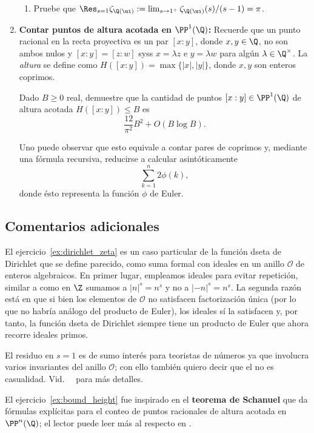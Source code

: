 \documentclass[11pt, reqno]{amsart}
\begin{document}
\begin{enumerate}
\begin{enumerate}
			\item\lookst
				Pruebe que $\Res_{s=1} \zeta_{\Q(\ui)} := \lim_{s \to 1^+} \zeta_{\Q(\ui)}(s)/(s - 1) = \pi$.
		\end{enumerate}

		\newex
	\item\label{ex:bound_height} \lookst
		\textbf{Contar puntos de altura acotada en $\PP^1(\Q)$:}
		Recuerde que un punto racional en la recta proyectiva es un par $[x : y]$, donde $x, y \in \Q$, no son ambos nulos y $[x :
		y] = [z : w]$ syss $x = \lambda z$ e $y = \lambda w$ para algún $\lambda \in \Q^\times$.
		La \emph{altura} se define como $H([x : y]) = \max\{ |x|, |y| \}$, donde $x, y$ son enteros coprimos.

		Dado $B \ge 0$ real, demuestre que la cantidad de puntos $[x : y] \in \PP^1(\Q)$ de altura acotada $H([x : y]) \le B$ es
		$$ \frac{12}{\pi^2}B^2 + O(B \log B). $$
		\begin{hint}
			Uno puede observar que esto equivale a contar pares de coprimos y, mediante una fórmula recursiva, reducirse a calcular
			asintóticamente
			$$ \sum_{k=1}^{n} 2\phi(k), $$
			donde ésto representa la función $\phi$ de Euler.
		\end{hint}
\end{enumerate}

\begin{additional}
\appendix
\section{Comentarios adicionales}
El ejercicio~\ref{ex:dirichlet_zeta} es un caso particular de la función dseta de Dirichlet que se define parecido, como suma formal con
ideales en un anillo $\mathcal{O}$ de enteros algebraicos.
En primer lugar, empleamos ideales para evitar repetición, similar a como en $\Z$ sumamos a $|n|^s = n^s$ y no a $\lvert-n\rvert^s = n^s$.
La segunda razón está en que si bien los elementos de $\mathcal{O}$ no satisfacen factorización única (por lo que no habría análogo del
producto de Euler), los ideales sí la satisfacen y, por tanto, la función dseta de Dirichlet siempre tiene un producto de Euler que ahora
recorre ideales primos.

El residuo en $s = 1$ es de sumo interés para teoristas de números ya que involucra varios invariantes del anillo $\mathcal{O}$;
con ello también quiero decir que el \textquote{$\pi$} no es casualidad.
Vid.\ \citeauthor{lang:algebraic}~\cite[259]{lang:algebraic} para más detalles.

El ejercicio~\ref{ex:bound_height} fue inspirado en el \textbf{teorema de Schanuel} que da fórmulas explícitas para el conteo de puntos
racionales de altura acotada en $\PP^n(\Q)$;
el lector puede leer más al respecto en \cite{hindry:diophantine}.

\printbibliography[title={Referencias y lecturas adicionales}]
\end{additional}
\end{document}
